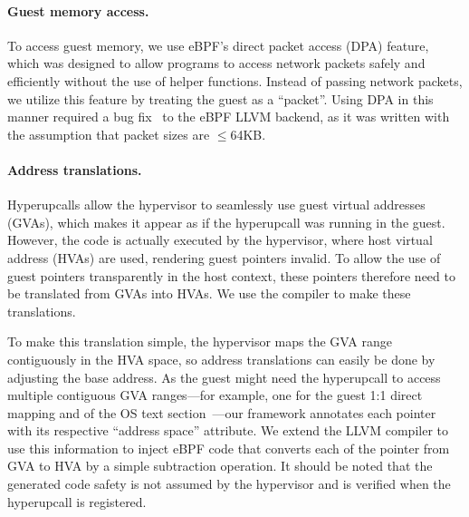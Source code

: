 \documentclass[11pt]{article}
\newcommand{\Hypercallback}{Hyperupcall\xspace{}}
\newcommand{\hypercallback}{hyperupcall\xspace{}}
\newcommand{\hide}[1]{}
\begin{document}
\paragraph{Guest memory access.}

To access guest memory, we use eBPF's direct packet 
access (DPA) feature, which was designed to allow programs to access network
packets safely and efficiently without the use of helper functions.
Instead of passing network packets, we utilize this feature by treating the 
 guest as a ``packet''. Using DPA in this manner required a bug 
 fix~\cite{amit17llvm} to the eBPF LLVM backend, as it was written with
 the assumption that packet sizes are $\leq$64KB.


\paragraph{Address translations.}

\Hypercallback{}s allow the hypervisor to seamlessly use guest virtual
addresses (GVAs), which makes it
appear as if the \hypercallback{} was running in the guest. However, the code is actually executed by the
hypervisor, where host virtual address (HVAs) are used, rendering guest pointers invalid.
To allow the use of guest pointers transparently in the host context, these pointers therefore
need to be translated from GVAs into HVAs. We use the compiler to make these translations.

To make this translation simple, the hypervisor maps the GVA range contiguously
in the HVA space, so address translations can easily be done by adjusting the base address.
As the guest might need the \hypercallback{} to access multiple contiguous GVA 
ranges---for example, one for the guest 1:1 direct mapping and of the OS text section~\cite{kleen04map}---our framework
annotates each pointer with its respective ``address space'' attribute. We extend the LLVM compiler
to use this information to inject eBPF code that converts each of the pointer from
GVA to HVA by a simple subtraction operation. It should be noted that the generated code safety
is not assumed by the hypervisor and is verified when the \hypercallback{} 
is registered.

\hide{
, which is provided in the \texttt{hdp}
parameter shown in Figure~\ref{fig:bpf_example}. 
}

\end{document}
